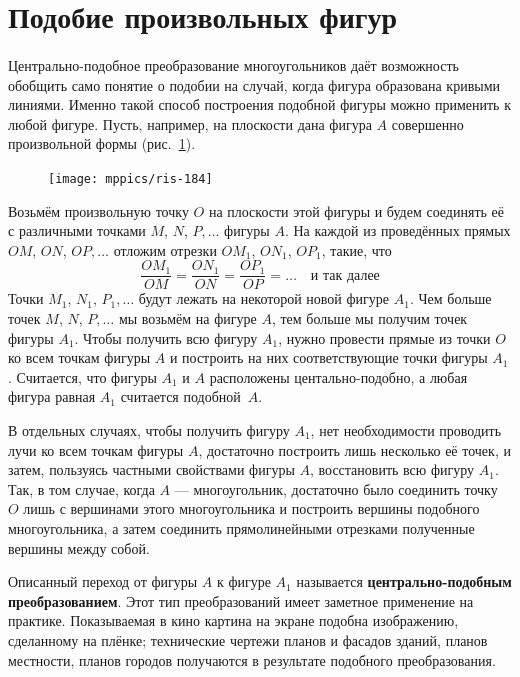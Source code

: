 \documentclass[twoside]{book}
\makeatletter
\newcommand{\rindex}[2][\imki@jobname]{%
  \index[#1]{\detokenize{#2}}%
}
\makeatother
\begin{document}
\section{Подобие произвольных фигур}

\paragraph{}\label{1938/177}
Центрально-подобное преобразование многоугольников даёт возможность обобщить само понятие о подобии на случай, когда фигура образована кривыми линиями.
Именно такой способ построения подобной фигуры можно применить к любой фигуре.
Пусть, например, на плоскости дана фигура $A$ совершенно произвольной формы (рис.~\ref{1938/ris-184}).

\begin{figure}[h]
\centering
\texttt{[image: mppics/ris-184]}
\caption{}\label{1938/ris-184}
\end{figure}

Возьмём произвольную точку $O$ на плоскости этой фигуры и будем соединять её с различными точками $M$, $N$, $P,\dots$
фигуры $A$.
На каждой из проведённых прямых $OM$, $ON$, $OP,\dots$
отложим отрезки $OM_1$, $ON_1$, $OP_1$, такие, что 
\[\frac{OM_1}{OM}=\frac{ON_1}{ON}=\frac{OP_1}{OP}=\dots\quad\text{и так далее}\]
Точки $M_1$, $N_1$, $P_1,\dots$ будут лежать на некоторой новой фигуре $A_1$.
Чем больше точек $M$, $N$, $P,\dots$
мы возьмём на фигуре $A$, тем больше мы получим точек фигуры $A_1$.
Чтобы получить всю фигуру $A_1$, нужно провести прямые из точки $O$ ко всем точкам фигуры $A$ и построить на них соответствующие точки фигуры $A_1$.
Считается, что фигуры $A_1$ и $A$ расположены центально-подобно,
а любая фигура равная $A_1$ считается подобной~$A$.

В отдельных случаях, чтобы получить фигуру $A_1$, нет необходимости проводить лучи ко всем точкам фигуры $A$, достаточно построить лишь несколько её точек, и затем, пользуясь частными свойствами фигуры $A$, восстановить всю фигуру $A_1$.
Так, в том случае, когда $A$ — многоугольник, достаточно было соединить точку $O$ лишь с вершинами этого многоугольника и построить вершины подобного многоугольника, а затем соединить прямолинейными отрезками полученные вершины между собой.

{\sloppy

Описанный переход от фигуры $A$ к фигуре $A_1$ называется \rindex{центрально-подобное преобразование}\textbf{центрально-подобным преобразованием}. 
Этот тип преобразований имеет заметное применение на практике.
Показываемая в кино картина на экране подобна изображению, сделанному на плёнке;
технические чертежи планов и фасадов зданий, планов местности, планов городов
получаются в результате подобного преобразования.

}
\end{document}
